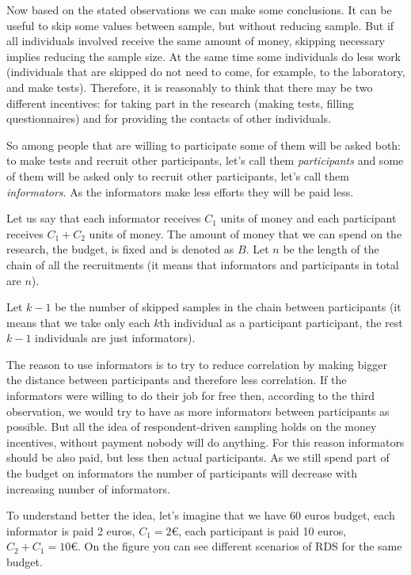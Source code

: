 \documentclass[12pt]{report}
\begin{document}
Now based on the stated observations we can make some conclusions. It can be useful to skip some values between sample, but without reducing sample. But if all individuals involved receive the same amount of money, skipping necessary implies reducing the sample size. At the same time some individuals do less work (individuals that are skipped do not need to come, for example, to the laboratory, and make tests). Therefore, it is reasonably to think that there may be two different incentives: for taking part in the research (making tests, filling questionnaires) and for providing the contacts of other individuals.
 
So among people that are willing to participate some of them will be asked both: to make tests and recruit other participants, let's call them \textit{participants} and some of them will be asked only to recruit other participants, let's call them \textit{informators}. As the informators make less efforts they will be paid less. 


Let us say that each informator receives $C_1$  units of money and each participant receives $C_1 + C_2$ units of money. The amount of money that we can spend on the research, the budget, is fixed and is denoted as $B$. 
Let $n$ be the length of the chain of all the recruitments (it means that informators and participants in total are $n$).

Let $k-1$ be the number of skipped samples in the chain between participants (it means that we take only each $k$th individual as a participant participant, the rest $k-1$ individuals are just informators).

The reason to use informators is to try to reduce correlation by making bigger the distance between participants and therefore less correlation. If the informators were willing to do their job for free then, according to the third observation, we would try to have as more informators between participants as possible. But all the idea of respondent-driven sampling holds on the money incentives, without payment nobody will do anything. For this reason informators should be also paid, but less then actual participants. As we still spend part of the budget on informators the number of participants will decrease with increasing number of informators. 

To understand better the idea, let's imagine that we have 60 euros budget, each informator is paid 2 euros, $C_1 = 2$\euro, each participant is paid 10 euros, $C_2 + C_1 = 10$\euro. On the figure you can see different scenarios of RDS for the same budget. 
\end{document}
